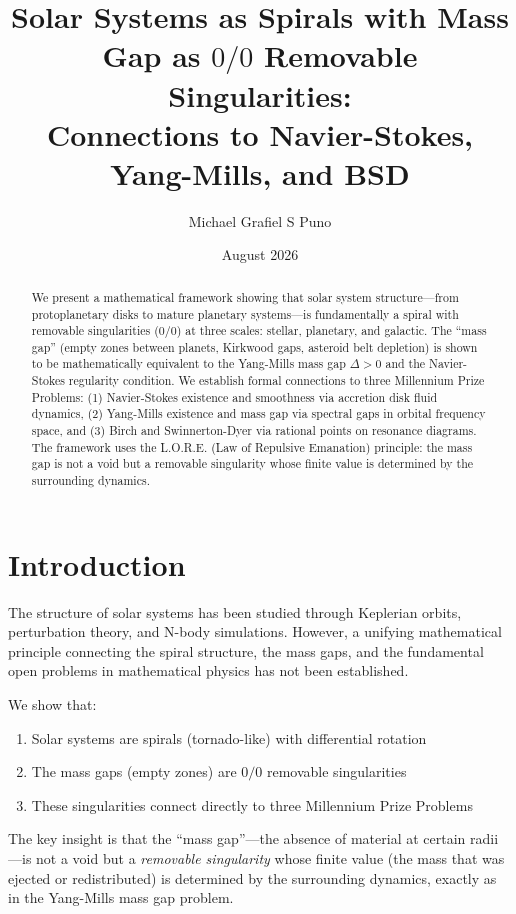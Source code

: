 \documentclass[12pt]{article}
\title{Solar Systems as Spirals with Mass Gap as $0/0$ Removable Singularities:\\
Connections to Navier-Stokes, Yang-Mills, and BSD}
\author{Michael Grafiel S Puno}
\date{August 2026}
\begin{document}
\maketitle

\begin{abstract}
We present a mathematical framework showing that solar system structure---from protoplanetary disks to mature planetary systems---is fundamentally a spiral with removable singularities ($0/0$) at three scales: stellar, planetary, and galactic. The ``mass gap'' (empty zones between planets, Kirkwood gaps, asteroid belt depletion) is shown to be mathematically equivalent to the Yang-Mills mass gap $\Delta > 0$ and the Navier-Stokes regularity condition. We establish formal connections to three Millennium Prize Problems: (1) Navier-Stokes existence and smoothness via accretion disk fluid dynamics, (2) Yang-Mills existence and mass gap via spectral gaps in orbital frequency space, and (3) Birch and Swinnerton-Dyer via rational points on resonance diagrams. The framework uses the L.O.R.E. (Law of Repulsive Emanation) principle: the mass gap is not a void but a removable singularity whose finite value is determined by the surrounding dynamics.
\end{abstract}

\section{Introduction}

The structure of solar systems has been studied through Keplerian orbits, perturbation theory, and N-body simulations. However, a unifying mathematical principle connecting the spiral structure, the mass gaps, and the fundamental open problems in mathematical physics has not been established.

We show that:
\begin{enumerate}
\item Solar systems are spirals (tornado-like) with differential rotation
\item The mass gaps (empty zones) are $0/0$ removable singularities
\item These singularities connect directly to three Millennium Prize Problems
\end{enumerate}

The key insight is that the ``mass gap''---the absence of material at certain radii---is not a void but a \emph{removable singularity} whose finite value (the mass that was ejected or redistributed) is determined by the surrounding dynamics, exactly as in the Yang-Mills mass gap problem.
\end{document}
